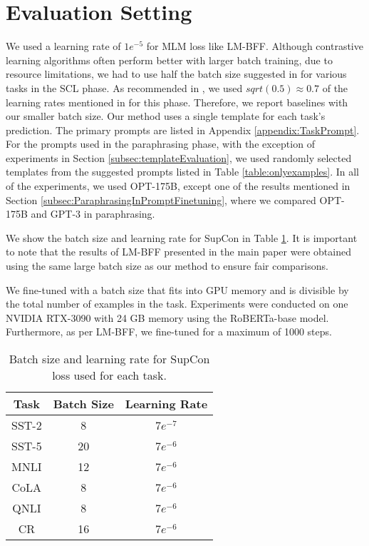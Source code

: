 \documentclass[11pt]{article}
\begin{document}
\renewcommand{\thealgorithm}{\Alph{section}.\arabic{algorithm}}

\section{Evaluation Setting}
\label{appendix:BatchSizeAndLearningDetails}

We used a learning rate of $1e^{-5}$ for MLM loss like LM-BFF. Although contrastive learning algorithms often perform better with larger batch training, due to resource limitations, we had to use half the batch size suggested in  for various tasks in the SCL phase. As recommended in , we used $sqrt(0.5) \approx 0.7$ of the learning rates mentioned in  for this phase. Therefore, we report baselines with our smaller batch size. Our method uses a single template for each task's prediction. The primary prompts are listed in Appendix \ref{appendix:TaskPrompt}. For the prompts used in the paraphrasing phase, with the exception of experiments in Section \ref{subsec:templateEvaluation}, we used randomly selected templates from the suggested prompts listed in Table \ref{table:onlyexamples}. In all of the experiments, we used OPT-175B, except one of the results mentioned in Section \ref{subsec:ParaphrasingInPromptFinetuning}, where we compared OPT-175B and GPT-3 in paraphrasing.

We show the batch size and learning rate for SupCon in Table \ref{table:batchsizeandlearningrate}. It is important to note that the results of LM-BFF presented in the main paper were obtained using the same large batch size as our method to ensure fair comparisons.

We fine-tuned with a batch size that fits into GPU memory and is divisible by the total number of examples in the task. Experiments were conducted on one NVIDIA RTX-3090 with 24 GB memory using the RoBERTa-base model. Furthermore, as per LM-BFF, we fine-tuned for a maximum of 1000 steps.

\begin{table}[!ht]
    \centering
    \begin{tabular}{c|cc}
    \hline
    Task  & Batch Size & Learning Rate \\ \hline
    SST-2 & 8          & $7e^{-7}$     \\
    SST-5 & 20         & $7e^{-6}$     \\
    MNLI  & 12         & $7e^{-6}$     \\
    CoLA  & 8          & $7e^{-6}$     \\
    QNLI  & 8          & $7e^{-6}$     \\
    CR    & 16         & $7e^{-6}$     \\ \hline
    \end{tabular}
    \caption{Batch size and learning rate for SupCon loss used for each task.}
    \label{table:batchsizeandlearningrate}
\end{table}
\end{document}
